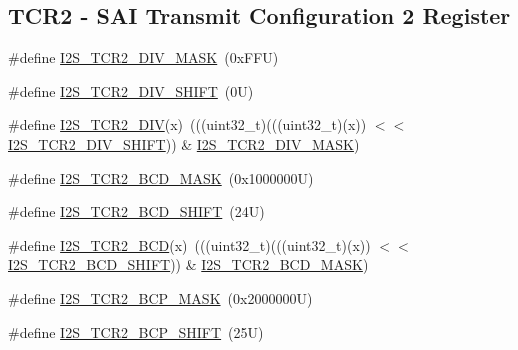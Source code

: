 \subsection*{T\+C\+R2 -\/ S\+AI Transmit Configuration 2 Register}
\begin{DoxyCompactItemize}
\item 
\#define \mbox{\hyperlink{group___i2_s___register___masks_ga9bbd597b1d3a839f74d15c3b6c309bb7}{I2\+S\+\_\+\+T\+C\+R2\+\_\+\+D\+I\+V\+\_\+\+M\+A\+SK}}~(0x\+F\+F\+U)
\item 
\#define \mbox{\hyperlink{group___i2_s___register___masks_gad553f8b1c1cc03ded483d997640b410a}{I2\+S\+\_\+\+T\+C\+R2\+\_\+\+D\+I\+V\+\_\+\+S\+H\+I\+FT}}~(0\+U)
\item 
\#define \mbox{\hyperlink{group___i2_s___register___masks_ga89a576437056ff39e6a6e0474cbd8371}{I2\+S\+\_\+\+T\+C\+R2\+\_\+\+D\+IV}}(x)~(((uint32\+\_\+t)(((uint32\+\_\+t)(x)) $<$$<$ \mbox{\hyperlink{group___i2_s___register___masks_gad553f8b1c1cc03ded483d997640b410a}{I2\+S\+\_\+\+T\+C\+R2\+\_\+\+D\+I\+V\+\_\+\+S\+H\+I\+FT}})) \& \mbox{\hyperlink{group___i2_s___register___masks_ga9bbd597b1d3a839f74d15c3b6c309bb7}{I2\+S\+\_\+\+T\+C\+R2\+\_\+\+D\+I\+V\+\_\+\+M\+A\+SK}})
\item 
\#define \mbox{\hyperlink{group___i2_s___register___masks_gacd5946c8455382794be20e9454c7d688}{I2\+S\+\_\+\+T\+C\+R2\+\_\+\+B\+C\+D\+\_\+\+M\+A\+SK}}~(0x1000000\+U)
\item 
\#define \mbox{\hyperlink{group___i2_s___register___masks_ga2c6578a7b0e95314b9211083cd31494e}{I2\+S\+\_\+\+T\+C\+R2\+\_\+\+B\+C\+D\+\_\+\+S\+H\+I\+FT}}~(24\+U)
\item 
\#define \mbox{\hyperlink{group___i2_s___register___masks_ga3f1f6042bd19880b4d9b8d4d98d05458}{I2\+S\+\_\+\+T\+C\+R2\+\_\+\+B\+CD}}(x)~(((uint32\+\_\+t)(((uint32\+\_\+t)(x)) $<$$<$ \mbox{\hyperlink{group___i2_s___register___masks_ga2c6578a7b0e95314b9211083cd31494e}{I2\+S\+\_\+\+T\+C\+R2\+\_\+\+B\+C\+D\+\_\+\+S\+H\+I\+FT}})) \& \mbox{\hyperlink{group___i2_s___register___masks_gacd5946c8455382794be20e9454c7d688}{I2\+S\+\_\+\+T\+C\+R2\+\_\+\+B\+C\+D\+\_\+\+M\+A\+SK}})
\item 
\#define \mbox{\hyperlink{group___i2_s___register___masks_gacd80d1c94434950d1e8bd33024b04018}{I2\+S\+\_\+\+T\+C\+R2\+\_\+\+B\+C\+P\+\_\+\+M\+A\+SK}}~(0x2000000\+U)
\item 
\#define \mbox{\hyperlink{group___i2_s___register___masks_gaafb7626321ba09185e45c9136b804732}{I2\+S\+\_\+\+T\+C\+R2\+\_\+\+B\+C\+P\+\_\+\+S\+H\+I\+FT}}~(25\+U)
\item 

\end{DoxyCompactItemize}
